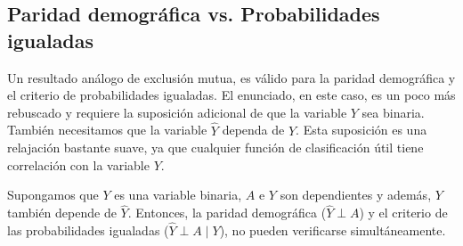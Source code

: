 \documentclass[oneside,openright,titlepage,numbers=noenddot,openany,headinclude,footinclude=true,
cleardoublepage=empty,abstractoff,BCOR=5mm,paper=a4,fontsize=12pt,main=spanish]{scrreprt}
\begin{document}
\subsection{Paridad demográfica vs. Probabilidades igualadas}

Un resultado análogo de exclusión mutua, es válido para la paridad demográfica y el criterio de probabilidades igualadas. El enunciado, en este caso, es un poco más rebuscado y requiere la suposición adicional de que la variable $Y$ sea binaria. También necesitamos que la variable $\hat{Y}$ dependa de $Y$. Esta suposición es una relajación bastante suave, ya que cualquier función de clasificación útil tiene correlación con la variable $Y$.\\

\begin{lemma} 
Supongamos que $Y$ es una variable binaria, $A$ e $Y$ son dependientes y además, $Y$  también depende de $\hat{Y}$. Entonces, la paridad demográfica ($\hat{Y} \perp A$) y el criterio de las probabilidades igualadas ($\hat{Y} \perp A \mid Y$), no pueden verificarse simultáneamente.
\label{lem:demoigu}
\end{lemma}
\end{document}

